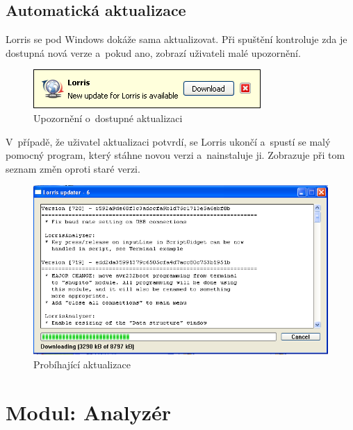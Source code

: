 \documentclass[12pt, a4paper, oneside]{article}
\begin{document}
\subsection{Automatická aktualizace}
Lorris se pod Windows dokáže sama aktualizovat. Při spuštění kontroluje zda je dostupná nová verze a~pokud ano, zobrazí uživateli malé upozornění.
\begin{figure}[H]
\begin{center}
\includegraphics[scale=1]{img/update_notify.png}
\caption{Upozornění o~dostupné aktualizaci}
\end{center}
\end{figure}
V~případě, že uživatel aktualizaci potvrdí, se Lorris ukončí a~spustí se malý pomocný program, který stáhne novou verzi a~nainstaluje ji. Zobrazuje při tom seznam změn oproti staré verzi.
\begin{figure}[H]
\begin{center}
\includegraphics[scale=0.65]{img/updater.png}
\caption{Probíhající aktualizace}
\end{center}
\end{figure}

\newpage
\section{Modul: Analyzér}
\end{document}

